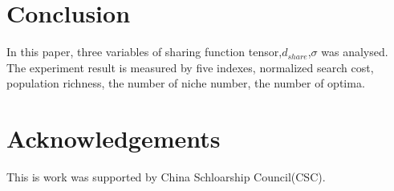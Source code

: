 \documentclass[smallextended]{svjour3}       %
\begin{document}
\begin{multicols}{2}
\section{Conclusion}
In this paper, three variables of sharing function tensor,$d_{share}$,$\sigma$
was analysed.  The experiment result is measured by five indexes, normalized
search cost, population richness, the number of niche number, the number of
optima. 

\section{Acknowledgements}
This is work was supported by China Schloarship Council(CSC).

%


\end{multicols}
\end{document}
